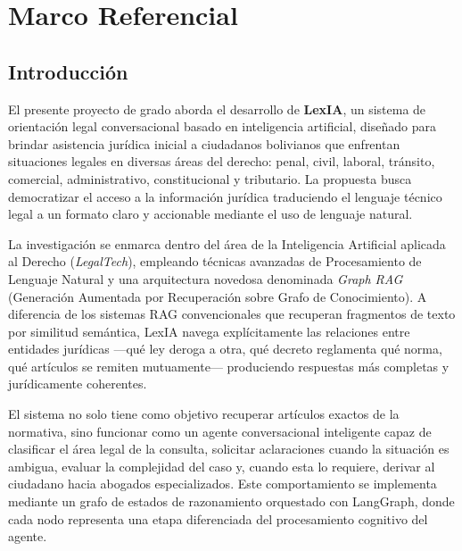 \documentclass[12pt, letterpaper]{report}
\begin{document}
\renewcommand{\contentsname}{\hfill Indice}
\tableofcontents
\newpage

\renewcommand{\listfigurename}{\hfill Indice de figuras}
\listoffigures
\newpage

\renewcommand{\listtablename}{\hfill Indice de tablas}
\listoftables
\newpage

\setcounter{page}{1}

\chapter{Marco Referencial}

\section{Introducci\'{o}n}

El presente proyecto de grado aborda el desarrollo de \textbf{LexIA}, un sistema de orientaci\'{o}n legal conversacional basado en inteligencia artificial, dise\~{n}ado para brindar asistencia jur\'{i}dica inicial a ciudadanos bolivianos que enfrentan situaciones legales en diversas \'{a}reas del derecho: penal, civil, laboral, tr\'{a}nsito, comercial, administrativo, constitucional y tributario. La propuesta busca democratizar el acceso a la informaci\'{o}n jur\'{i}dica traduciendo el lenguaje t\'{e}cnico legal a un formato claro y accionable mediante el uso de lenguaje natural.

La investigaci\'{o}n se enmarca dentro del \'{a}rea de la Inteligencia Artificial aplicada al Derecho (\textit{LegalTech}), empleando t\'{e}cnicas avanzadas de Procesamiento de Lenguaje Natural y una arquitectura novedosa denominada \textit{Graph RAG} (Generaci\'{o}n Aumentada por Recuperaci\'{o}n sobre Grafo de Conocimiento). A diferencia de los sistemas RAG convencionales que recuperan fragmentos de texto por similitud sem\'{a}ntica, LexIA navega expl\'{i}citamente las relaciones entre entidades jur\'{i}dicas ---qu\'{e} ley deroga a otra, qu\'{e} decreto reglamenta qu\'{e} norma, qu\'{e} art\'{i}culos se remiten mutuamente--- produciendo respuestas m\'{a}s completas y jur\'{i}dicamente coherentes.

El sistema no solo tiene como objetivo recuperar art\'{i}culos exactos de la normativa, sino funcionar como un agente conversacional inteligente capaz de clasificar el \'{a}rea legal de la consulta, solicitar aclaraciones cuando la situaci\'{o}n es ambigua, evaluar la complejidad del caso y, cuando esta lo requiere, derivar al ciudadano hacia abogados especializados. Este comportamiento se implementa mediante un grafo de estados de razonamiento orquestado con LangGraph, donde cada nodo representa una etapa diferenciada del procesamiento cognitivo del agente.
\end{document}
